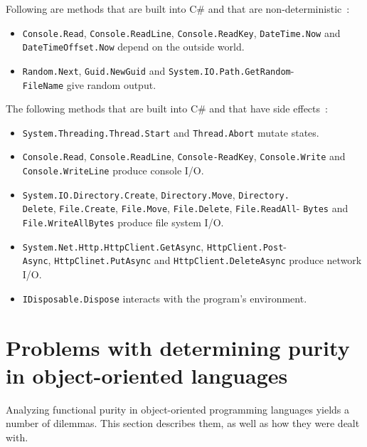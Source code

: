 \documentclass[a4paper,12pt]{article}
\begin{document}
Following are methods that are built into C\# and that are non-deterministic~\cite{dixin2015}:

\begin{itemize}
  \item \texttt{Console.Read}, \texttt{Console.ReadLine}, \texttt{Console.ReadKey}, \texttt{DateTime\allowbreak.Now} and \texttt{DateTimeOffset.Now} depend on the outside world.
  \item \texttt{Random.Next}, \texttt{Guid.NewGuid} and \texttt{System.IO.Path.GetRandom}-\\\texttt{\allowbreak FileName} give random output.
\end{itemize}

The following methods that are built into C\# and that have side effects~\cite{dixin2015}:

\begin{itemize}
  \item \texttt{System.Threading.Thread.Start} and \texttt{Thread.Abort} mutate states.
  \item \texttt{Console.Read}, \texttt{Console.ReadLine}, \texttt{Console-ReadKey}, \texttt{Console.\allowbreak Write} and \texttt{Console.WriteLine} produce console I/O.
  \item \texttt{System.IO.Directory.Create}, \texttt{Directory.Move}, \texttt{Directory.}\\\texttt{Delete}, \texttt{File.Create}, \texttt{File.Move}, \texttt{File.Delete}, \texttt{File.ReadAll\allowbreak }- \texttt{Bytes} and \texttt{File.WriteAllBytes} produce file system I/O.
  \item \texttt{System.Net.Http.HttpClient.GetAsync}, \texttt{HttpClient.Post}- \\\texttt{Async}, \texttt{HttpClinet.PutAsync} and \texttt{HttpClient.DeleteAsync} produce network I/O.
  \item \texttt{IDisposable.Dispose} interacts with the program's environment.
\end{itemize}

\section{Problems with determining purity in object-oriented languages} \label{sec:problems-with-purity-in-oo}

Analyzing functional purity in object-oriented programming languages yields a number of dilemmas. This section describes them, as well as how they were dealt with.
\end{document}

